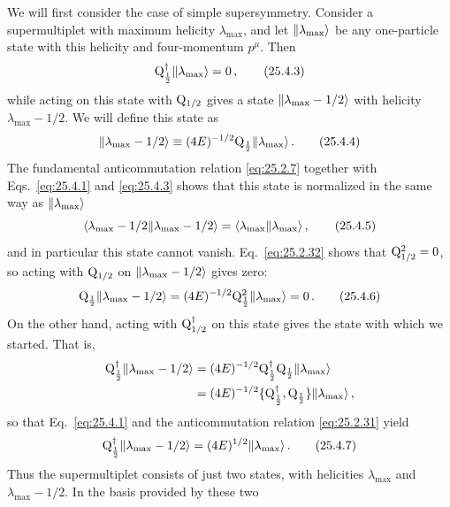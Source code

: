 We will first consider the case of simple supersymmetry. Consider a
supermultiplet with maximum helicity $\lambda_{\max}$, and let
$\lVert \lambda_{\max}\rangle$ be any one-particle state with this helicity and
four-momentum $p^\mu$. Then
\begin{equation}
  \mathrm{Q}^\dagger_{\frac12}\lVert \lambda_{\max}\rangle=0\,,
  \tag{25.4.3}\label{eq:25.4.3}
\end{equation}
while acting on this state with $\mathrm{Q}_{1/2}$ gives a state
$\lVert \lambda_{\max}-1/2\rangle$ with helicity $\lambda_{\max}-1/2$. We will
define this state as
\begin{equation}
  \lVert \lambda_{\max}-1/2\rangle
  \equiv(4E)^{-1/2}\mathrm{Q}_{\frac12}\lVert \lambda_{\max}\rangle\,.
  \tag{25.4.4}\label{eq:25.4.4}
\end{equation}
The fundamental anticommutation relation \eqref{eq:25.2.7} together with
Eqs.~\eqref{eq:25.4.1} and \eqref{eq:25.4.3} shows that this state is
normalized in the same way as $\lVert \lambda_{\max}\rangle$
\begin{equation}
  \langle \lambda_{\max}-1/2\Vert \lambda_{\max}-1/2\rangle
  =\langle \lambda_{\max}\Vert \lambda_{\max}\rangle\,,
  \tag{25.4.5}\label{eq:25.4.5}
\end{equation}
and in particular this state cannot vanish. Eq.~\eqref{eq:25.2.32} shows that
$\mathrm{Q}_{1/2}^2=0$, so acting with $\mathrm{Q}_{1/2}$ on
$\lVert \lambda_{\max}-1/2\rangle$ gives zero:
\begin{equation}
  \mathrm{Q}_{\frac12}\lVert \lambda_{\max}-1/2\rangle
  =(4E)^{-1/2}\mathrm{Q}_{\frac12}^2\lVert \lambda_{\max}\rangle
  =0\,.
  \tag{25.4.6}\label{eq:25.4.6}
\end{equation}
On the other hand, acting with $\mathrm{Q}^\dagger_{1/2}$ on this state gives the
state with which we started. That is,
\[
  \begin{aligned}
  \mathrm{Q}^\dagger_{\frac12}\lVert \lambda_{\max}-1/2\rangle
  &=(4E)^{-1/2}
    \mathrm{Q}^\dagger_{\frac12}\mathrm{Q}_{\frac12}
    \lVert \lambda_{\max}\rangle\\
  &=(4E)^{-1/2}
    \{\mathrm{Q}^\dagger_{\frac12},\mathrm{Q}_{\frac12}\}
    \lVert \lambda_{\max}\rangle\,,
  \end{aligned}
\]
so that Eq.~\eqref{eq:25.4.1} and the anticommutation relation
\eqref{eq:25.2.31} yield
\begin{equation}
  \mathrm{Q}^\dagger_{\frac12}\lVert \lambda_{\max}-1/2\rangle
  =(4E)^{1/2}\lVert \lambda_{\max}\rangle\,.
  \tag{25.4.7}\label{eq:25.4.7}
\end{equation}
Thus the supermultiplet consists of just two states, with helicities
$\lambda_{\max}$ and $\lambda_{\max}-1/2$. In the basis provided by these two
